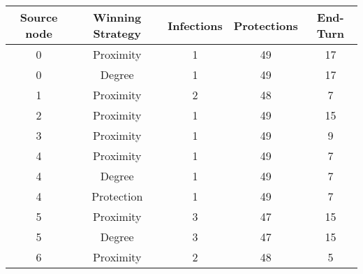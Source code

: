 \documentclass[results.tex]{subfiles}
\begin{document}
    \begin{center}
        \begin{tabular}{| c || c | c | c | c |}
            \hline
            {\bfseries Source node} & {\bfseries Winning Strategy} & {\bfseries Infections} & {\bfseries Protections}
            & {\bfseries End-Turn}
            \\  %
            \hline\hline
            0                       & Proximity                    & 1                      & 49                      & 17                   \\
            \hline
            0                       & Degree                       & 1                      & 49                      & 17                   \\
            \hline
            1                       & Proximity                    & 2                      & 48                      & 7                    \\
            \hline
            2                       & Proximity                    & 1                      & 49                      & 15                   \\
            \hline
            3                       & Proximity                    & 1                      & 49                      & 9                    \\
            \hline
            4                       & Proximity                    & 1                      & 49                      & 7                    \\
            \hline
            4                       & Degree                       & 1                      & 49                      & 7                    \\
            \hline
            4                       & Protection                   & 1                      & 49                      & 7                    \\
            \hline
            5                       & Proximity                    & 3                      & 47                      & 15                   \\
            \hline
            5                       & Degree                       & 3                      & 47                      & 15                   \\
            \hline
            6                       & Proximity                    & 2                      & 48                      & 5                    \\

\end{tabular}
\end{center}
\end{document}
